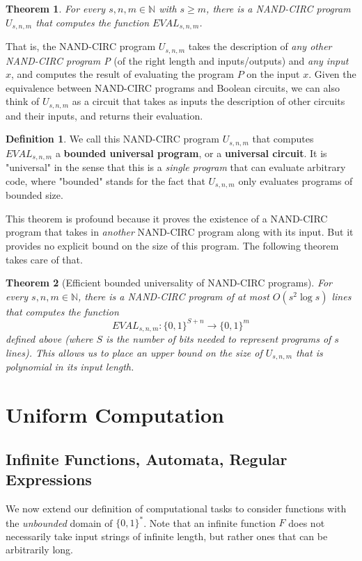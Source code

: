 \documentclass[a4paper, 12pt]{report}
\newtheorem{theorem}{Theorem}[section]
\theoremstyle{remark}
\theoremstyle{definition}
\newtheorem{definition}{Definition}[section]
\begin{document}
\begin{theorem}
For every $s, n, m \in \mathbb{N}$ with $s \geq m$, there is a NAND-CIRC program $U_{s, n, m}$ that computes the function $EVAL_{s, n, m}$. 
\end{theorem}

That is, the NAND-CIRC program $U_{s, n, m}$ takes the description of \textit{any other NAND-CIRC program P} (of the right length and inputs/outputs) and \textit{any input $x$}, and computes the result of evaluating the program $P$ on the input $x$. Given the equivalence between NAND-CIRC programs and Boolean circuits, we can also think of $U_{s, n, m}$ as a circuit that takes as inputs the description of other circuits and their inputs, and returns their evaluation. 

\begin{definition}
We call this NAND-CIRC program $U_{s, n, m}$ that computes $EVAL_{s, n, m}$ a \textbf{bounded universal program}, or a \textbf{universal circuit}. It is "universal" in the sense that this is a \textit{single program} that can evaluate arbitrary code, where "bounded" stands for the fact that $U_{s, n, m}$ only evaluates programs of bounded size. 
\end{definition}

This theorem is profound because it proves the existence of a NAND-CIRC program that takes in \textit{another} NAND-CIRC program along with its input. But it provides no explicit bound on the size of this program. The following theorem takes care of that. 

\begin{theorem}[Efficient bounded universality of NAND-CIRC programs]
For every $s, n, m \in \mathbb{N}$, there is a NAND-CIRC program of at most $O(s^2 \log s)$ lines that computes the function 
\[EVAL_{s, n, m}: \{0,1\}^{S+n} \longrightarrow \{0,1\}^m\]
defined above (where $S$ is the number of bits needed to represent programs of $s$ lines). This allows us to place an upper bound on the size of $U_{s, n, m}$ that is \textit{polynomial} in its input length. 
\end{theorem}



\chapter{Uniform Computation}
\section{Infinite Functions, Automata, Regular Expressions}
We now extend our definition of computational tasks to consider functions with the \textit{unbounded} domain of $\{0,1\}^*$. Note that an infinite function $F$ does not necessarily take input strings of infinite length, but rather ones that can be arbitrarily long. 
\end{document}
